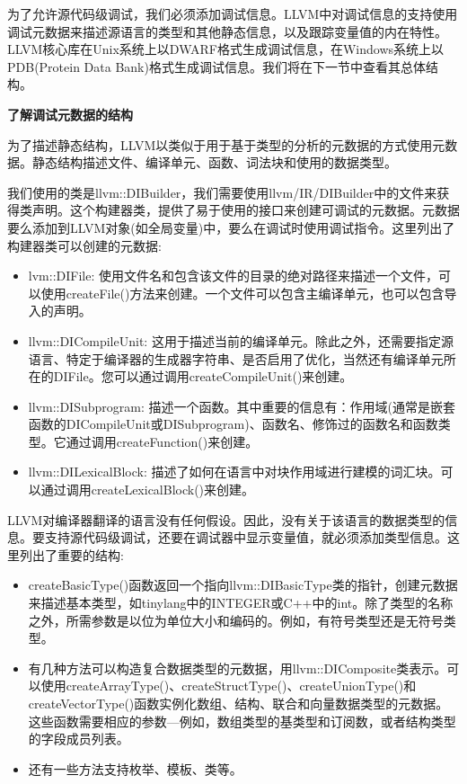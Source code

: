 
为了允许源代码级调试，我们必须添加调试信息。LLVM中对调试信息的支持使用调试元数据来描述源语言的类型和其他静态信息，以及跟踪变量值的内在特性。LLVM核心库在Unix系统上以DWARF格式生成调试信息，在Windows系统上以PDB(Protein Data Bank)格式生成调试信息。我们将在下一节中查看其总体结构。\par

\hspace*{\fill} \par %
\textbf{了解调试元数据的结构}

为了描述静态结构，LLVM以类似于用于基于类型的分析的元数据的方式使用元数据。静态结构描述文件、编译单元、函数、词法块和使用的数据类型。\par

我们使用的类是llvm::DIBuilder，我们需要使用llvm/IR/DIBuilder中的文件来获得类声明。这个构建器类，提供了易于使用的接口来创建可调试的元数据。元数据要么添加到LLVM对象(如全局变量)中，要么在调试时使用调试指令。这里列出了构建器类可以创建的元数据:\par

\begin{itemize}
\item lvm::DIFile: 使用文件名和包含该文件的目录的绝对路径来描述一个文件，可以使用createFile()方法来创建。一个文件可以包含主编译单元，也可以包含导入的声明。

\item llvm::DICompileUnit: 这用于描述当前的编译单元。除此之外，还需要指定源语言、特定于编译器的生成器字符串、是否启用了优化，当然还有编译单元所在的DIFile。您可以通过调用createCompileUnit()来创建。

\item llvm::DISubprogram: 描述一个函数。其中重要的信息有：作用域(通常是嵌套函数的DICom\allowbreak pileUnit或DISubprogram)、函数名、修饰过的函数名和函数类型。它通过调用createFunction()来创建。

\item llvm::DILexicalBlock: 描述了如何在语言中对块作用域进行建模的词汇块。可以通过调用createLexicalBlock()来创建。

\end{itemize}

LLVM对编译器翻译的语言没有任何假设。因此，没有关于该语言的数据类型的信息。要支持源代码级调试，还要在调试器中显示变量值，就必须添加类型信息。这里列出了重要的结构:\par

\begin{itemize}
\item createBasicType()函数返回一个指向llvm::DIBasicType类的指针，创建元数据来描述基本类型，如tinylang中的INTEGER或C++中的int。除了类型的名称之外，所需参数是以位为单位大小和编码的。例如，有符号类型还是无符号类型。

\item 有几种方法可以构造复合数据类型的元数据，用llvm::DIComposite类表示。可以使用createArr\allowbreak ayType()、createStructType()、createUnionType()和createVectorType()函数实例化数组、结构、联合和向量数据类型的元数据。这些函数需要相应的参数—例如，数组类型的基类型和订阅数，或者结构类型的字段成员列表。

\item 还有一些方法支持枚举、模板、类等。
\end{itemize}

